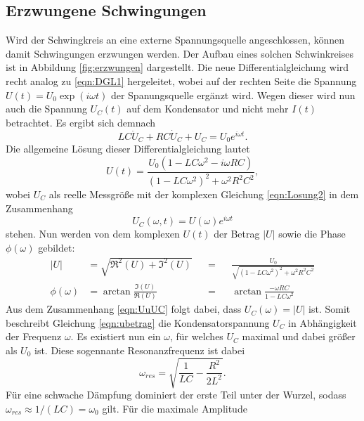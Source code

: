 \subsection{Erzwungene Schwingungen}
Wird der Schwingkreis an eine externe Spannungsquelle angeschlossen, können damit Schwingungen erzwungen werden. Der Aufbau eines solchen Schwinkreises
ist in Abbildung \ref{fig:erzwungen} dargestellt. Die neue Differentialgleichung wird recht analog zu \eqref{eqn:DGL1} hergeleitet, wobei auf der 
rechten Seite die Spannung $U(t)=U_0\exp(i\omega t)$ der Spanungsquelle ergänzt wird. Wegen dieser wird nun auch die Spannung $U_C(t)$ auf dem Kondensator
 und nicht mehr $I(t)$ betrachtet. Es ergibt sich demnach
\begin{equation}
    LC\ddot{U}_C+RC\dot{U}_C+U_C=U_0e^{i\omega t}   .
    \label{eqn:DGL2}
\end{equation}
Die allgemeine Lösung dieser Differentialgleichung lautet
\begin{equation}
    U(t)=\frac{U_0(1-LC\omega^2-i\omega RC)}{(1-LC\omega^2)^2+\omega^2R^2C^2}   ,
    \label{eqn:Losung2}
\end{equation}
wobei $U_C$ als reelle Messgröße mit der komplexen Gleichung \eqref{eqn:Losung2} in dem Zusammenhang
\begin{equation}
    U_C(\omega,t)=U(\omega)e^{i\omega t} \label{eqn:UuUC}
\end{equation} 
stehen. Nun werden von dem komplexen $U(t)$ der Betrag $|U|$ sowie die Phase $\phi(\omega)$ gebildet:
\begin{align} %
    |U|          &= \sqrt{\Re^2(U)+\Im^2(U)}      & &=& &\frac{U_0}{\sqrt{(1-LC\omega^2)^2+\omega^2R^2C^2}} \label{eqn:ubetrag} \\
    \phi(\omega) &= \arctan{\frac{\Im(U)}{\Re(U)}}& &=& &\arctan{\frac{-\omega RC}{1-LC\omega^2}} \label{eqn:uphase}
\end{align}
Aus dem Zusammenhang \eqref{eqn:UuUC} folgt dabei, dass $U_C(\omega)=|U|$ ist. Somit beschreibt Gleichung \eqref{eqn:ubetrag} die Kondensatorspannung
$U_C$ in Abhängigkeit der Frequenz $\omega$. Es existiert nun ein $\omega$, für welches $U_C$ maximal und dabei größer als $U_0$ ist. Diese 
sogennante Resonanzfrequenz ist dabei 
\begin{equation*}
    \omega_{res}=\sqrt{\frac{1}{LC}-\frac{R^2}{2L^2}}   .
\end{equation*}
Für eine schwache Dämpfung dominiert der erste Teil unter der Wurzel, sodass $\omega_{res}\approx 1/(LC)=\omega_0$ gilt. Für die maximale Amplitude

